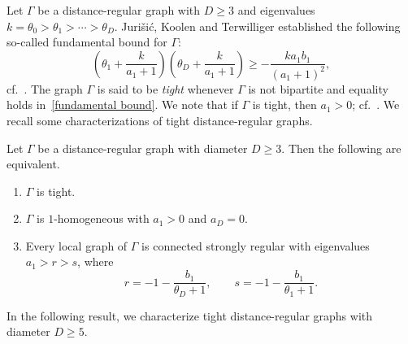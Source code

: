 Let $\Gamma$ be a distance-regular graph with $D\geqslant 3$ and eigenvalues $k=\theta_0> \theta_1 > \cdots > \theta_D$.
Juri\v si\'c, Koolen and Terwilliger established the following so-called fundamental bound for $\Gamma$:
\begin{equation}\label{fundamental bound}
	\left( \theta_1 +\frac{k}{a_1 +1} \right)\left( \theta_D +\frac{k}{a_1 +1}\right ) \geqslant -\frac{ka_1b_1}{(a_1 +1)^2},
\end{equation}
cf.~\cite[Theorem 6.2]{JKT2000}.
The graph $\Gamma$ is said to be \emph{tight} whenever $\Gamma$ is not bipartite and equality holds in~\eqref{fundamental bound}.
We note that if $\Gamma$ is tight, then $a_1 > 0$; cf.~\cite[Corollary 6.3]{JKT2000}.
We recall some characterizations of tight distance-regular graphs.
\begin{lemma}\label{char tightDRGs}
Let $\Gamma$ be a distance-regular graph with diameter $D\geqslant 3$. 
Then the following are equivalent.
\begin{enumerate}[\normalfont(i)]
	\setlength\itemsep{0pt}
	\item $\Gamma$ is tight.
	\item $\Gamma$ is $1$-homogeneous with $a_1 > 0$ and $a_D =0$.
	\item Every local graph of $\Gamma$ is connected strongly regular with eigenvalues $a_1>r>s$, where
	$$
		r= -1-\frac{b_1}{\theta_D+1}, \qquad s = -1-\frac{b_1}{\theta_1+1}.
	$$
\end{enumerate}
\end{lemma}

In the following result, we characterize tight distance-regular graphs with diameter $D \geqslant 5$.


